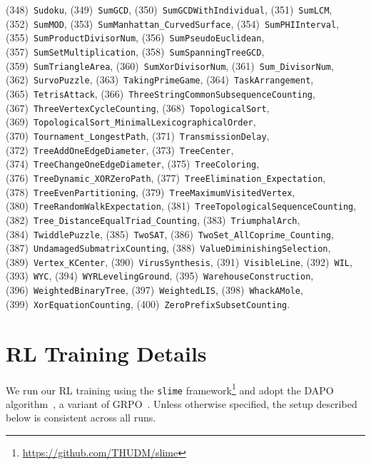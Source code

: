 \documentclass{article}
\theoremstyle{plain}
\theoremstyle{definition}
\theoremstyle{remark}
\begin{document}
\begin{flushleft}
(348)~\texttt{Sudoku},
(349)~\texttt{SumGCD},
(350)~\texttt{SumGCDWithIndividual},
(351)~\texttt{SumLCM},
(352)~\texttt{SumMOD},
(353)~\texttt{SumManhattan\_CurvedSurface},
(354)~\texttt{SumPHIInterval},
(355)~\texttt{SumProductDivisorNum},
(356)~\texttt{SumPseudoEuclidean},
(357)~\texttt{SumSetMultiplication},
(358)~\texttt{SumSpanningTreeGCD},
(359)~\texttt{SumTriangleArea},
(360)~\texttt{SumXorDivisorNum},
(361)~\texttt{Sum\_DivisorNum},
(362)~\texttt{SurvoPuzzle},
(363)~\texttt{TakingPrimeGame},
(364)~\texttt{TaskArrangement},
(365)~\texttt{TetrisAttack},
(366)~\texttt{ThreeStringCommonSubsequenceCounting},
(367)~\texttt{ThreeVertexCycleCounting},
(368)~\texttt{TopologicalSort},
(369)~\texttt{TopologicalSort\_MinimalLexicographicalOrder},
(370)~\texttt{Tournament\_LongestPath},
(371)~\texttt{TransmissionDelay},
(372)~\texttt{TreeAddOneEdgeDiameter},
(373)~\texttt{TreeCenter},
(374)~\texttt{TreeChangeOneEdgeDiameter},
(375)~\texttt{TreeColoring},
(376)~\texttt{TreeDynamic\_XORZeroPath},
(377)~\texttt{TreeElimination\_Expectation},
(378)~\texttt{TreeEvenPartitioning},
(379)~\texttt{TreeMaximumVisitedVertex},
(380)~\texttt{TreeRandomWalkExpectation},
(381)~\texttt{TreeTopologicalSequenceCounting},
(382)~\texttt{Tree\_DistanceEqualTriad\_Counting},
(383)~\texttt{TriumphalArch},
(384)~\texttt{TwiddlePuzzle},
(385)~\texttt{TwoSAT},
(386)~\texttt{TwoSet\_AllCoprime\_Counting},
(387)~\texttt{UndamagedSubmatrixCounting},
(388)~\texttt{ValueDiminishingSelection},
(389)~\texttt{Vertex\_KCenter},
(390)~\texttt{VirusSynthesis},
(391)~\texttt{VisibleLine},
(392)~\texttt{WIL},
(393)~\texttt{WYC},
(394)~\texttt{WYRLevelingGround},
(395)~\texttt{WarehouseConstruction},
(396)~\texttt{WeightedBinaryTree},
(397)~\texttt{WeightedLIS},
(398)~\texttt{WhackAMole},
(399)~\texttt{XorEquationCounting},
(400)~\texttt{ZeroPrefixSubsetCounting}.
\end{flushleft}









\section{RL Training Details}
\label{app:rl-details}

We run our RL training using the \texttt{slime} framework\footnote{\url{https://github.com/THUDM/slime}} and adopt the DAPO algorithm~\citep{yu2025dapo}, a variant of GRPO~\citep{shao2024grpo}.
Unless otherwise specified, the setup described below is consistent across all runs.
\end{document}
